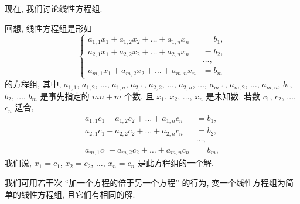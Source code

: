 \documentclass[../libro.tex]{subfiles}
\begin{document}
现在, 我们讨论线性方程组.

回想,
线性方程组是形如
\begin{equation*}
    \left\{ %
    \begin{aligned}
        a_{1,1} x_1 + a_{1,2} x_2 + \dots + a_{1,n} x_n & = b_1, \\
        a_{2,1} x_1 + a_{2,2} x_2 + \dots + a_{2,n} x_n & = b_2, \\
        & \dots, \\
        a_{m,1} x_1 + a_{m,2} x_2 + \dots + a_{m,n} x_n & = b_m
    \end{aligned}
    \right. %
\end{equation*}
的方程组,
其中,
\(a_{1,1}\), \(a_{1,2}\), \(\dots\), \(a_{1,n}\),
\(a_{2,1}\), \(a_{2,2}\), \(\dots\), \(a_{2,n}\),
\(\dots\),
\(a_{m,1}\), \(a_{m,2}\), \(\dots\), \(a_{m,n}\),
\(b_1\), \(b_2\), \(\dots\), \(b_m\)
是事先指定的 \(mn + m\) 个数,
且 \(x_1\), \(x_2\), \(\dots\), \(x_n\)
是未知数.
若数 \(c_1\), \(c_2\), \(\dots\), \(c_n\) 适合,
\begin{align*}
    a_{1,1} c_1 + a_{1,2} c_2 + \dots + a_{1,n} c_n & = b_1, \\
    a_{2,1} c_1 + a_{2,2} c_2 + \dots + a_{2,n} c_n & = b_2, \\
    & \dots, \\
    a_{m,1} c_1 + a_{m,2} c_2 + \dots + a_{m,n} c_n & = b_m,
\end{align*}
我们说,
\(x_1 = c_1\),
\(x_2 = c_2\),
\(\dots\),
\(x_n = c_n\)
是此方程组的一个解.

我们可用若干次 ``加一个方程的倍于另一个方程'' 的行为,
变一个线性方程组为简单的线性方程组,
且它们有相同的解.
\end{document}
